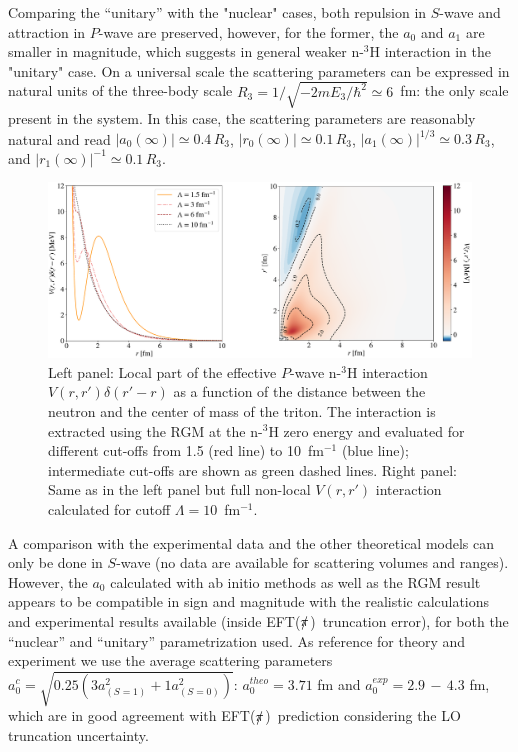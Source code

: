 \documentclass[5p,times]{elsarticle}
\newcommand{\eftnopi}{\mbox{EFT($\slashed{\pi}$) }}
\begin{document}
%
Comparing the ``unitary'' with the "nuclear" cases, both repulsion in $S$-wave and attraction in $P$-wave are preserved, however, for the former, the $a_0$ and $a_1$ are smaller in magnitude, which suggests in general weaker n-$^3$H interaction in the "unitary" case.
%
On a universal scale the scattering parameters can be expressed in
natural units of the three-body scale $R_3=1/\sqrt{-2mE_3/\hbar^2}\simeq 6$~fm: the only scale present in the system. 
In this case, the scattering parameters are reasonably natural and read $|a_0(\infty)|\simeq0.4\,R_3$, $|r_0(\infty)| \simeq 0.1\,R_3$, $|a_1(\infty)|^{1/3} \simeq 0.3\,R_3$, and $|r_1(\infty)|^{-1} \simeq 0.1\,R_3$. %
%

\begin{figure}
\centering
\includegraphics[width=\textwidth]{./Graphs/rgm}
\caption{Left panel: Local part of the effective $P$-wave n-$^3$H interaction $V(r,r')\delta(r'-r)$ as a function of the distance between the neutron and the center of mass of the triton. The interaction is extracted using the RGM at the n-$^3$H zero energy and evaluated for different cut-offs from 1.5 (red line) to 10~fm$^{-1}$ (blue line); intermediate cut-offs are shown as green dashed lines. Right panel: Same as in the left panel but full non-local $V(r,r')$ interaction calculated for cutoff $\Lambda=10$~fm$^{-1}$.}\label{Fig:Potential}
\end{figure}

%
A comparison with the experimental data and the other theoretical models can only be done in $S$-wave (no data are available for scattering volumes and ranges). However, the $a_0$ calculated with ab initio methods as well as the RGM result appears to be compatible in sign and magnitude with the realistic calculations and experimental results available (inside \eftnopi truncation error), for both the ``nuclear'' and ``unitary'' parametrization used. 
As reference for theory and experiment we use the average scattering parameters $a_0^c=\sqrt{0.25(3a_{(S=1)}^2+1a_{(S=0)}^2)}$:   $a_0^{theo}=3.71$ fm\cite{Lazauskas:2019hil} and $a_0^{exp}=2.9\,-\,4.3$ fm\cite{Tilley:1992zz}, 
which are in good agreement with \eftnopi prediction considering the LO truncation uncertainty. 
%
\end{document}
